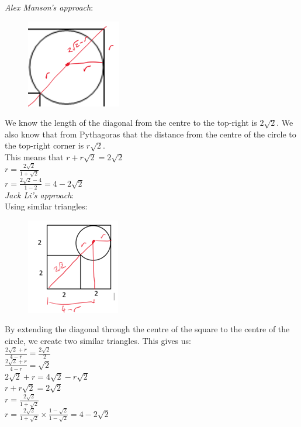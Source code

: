 \documentclass[../main.tex]{subfiles}
\begin{document}
\begin{enumerate}
    \textit{Alex Manson's approach}:\\
    \begin{figure}[H]
        \centering
        \includegraphics[width=0.2\linewidth]{images/t1w10q1_a2.png}
    \end{figure}
    We know the length of the diagonal from the centre to the top-right is \(2\sqrt{2}\). We also know that from Pythagoras that the distance from the centre of the circle to the top-right corner is \(r\sqrt{2}\).\\
    This means that \(r+r\sqrt{2}=2\sqrt{2}\)\\
    \(r=\frac{2\sqrt{2}}{1+\sqrt{2}}\)\\
    \(r=\frac{2\sqrt{2}-4}{1-2}=4-2\sqrt{2}\)\\

    \textit{Jack Li's approach}:\\
    Using similar triangles:
    \begin{figure}[H]
        \centering
        \includegraphics[width=0.2\linewidth]{images/t1w10q1_a3.png}
    \end{figure}
    By extending the diagonal through the centre of the square to the centre of the circle, we create two similar triangles. This gives us:\\
    \(\frac{2\sqrt{2}+r}{4-r}=\frac{2\sqrt{2}}{2}\)\\

    \(\frac{2\sqrt{2}+r}{4-r}=\sqrt{2}\)\\

    \(2\sqrt{2}+r=4\sqrt{2}-r\sqrt{2}\)\\

    \(r+r\sqrt{2}=2\sqrt{2}\)\\

    \(r=\frac{2\sqrt{2}}{1+\sqrt{2}}\)\\

    \(r=\frac{2\sqrt{2}}{1+\sqrt{2}}\times \frac{1-\sqrt{2}}{1-\sqrt{2}}=4-2\sqrt{2}\)\\
    

\end{enumerate}
\end{document}
